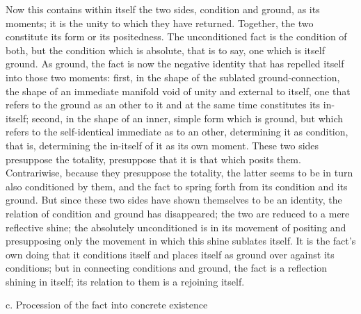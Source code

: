 Now this contains within itself the two sides,
condition and ground, as its moments;
it is the unity to which they have returned.
Together, the two constitute its form or its positedness.
The unconditioned fact is the condition of both,
but the condition which is absolute, that is to say,
one which is itself ground.
As ground, the fact is now the negative identity
that has repelled itself into those two moments:
first, in the shape of the sublated ground-connection,
the shape of an immediate manifold void of
unity and external to itself,
one that refers to the ground as an other to it
and at the same time constitutes its in-itself;
second, in the shape of an inner, simple form which is ground,
but which refers to the self-identical
immediate as to an other, determining it as condition,
that is, determining the in-itself of it as its own moment.
These two sides presuppose the totality,
presuppose that it is that which posits them.
Contrariwise, because they presuppose the totality,
the latter seems to be in turn also conditioned by them,
and the fact to spring forth from its condition and its ground.
But since these two sides have shown themselves to be an identity,
the relation of condition and ground has disappeared;
the two are reduced to a mere reflective shine;
the absolutely unconditioned is in its movement of positing
and presupposing only the movement in which this shine sublates itself.
It is the fact's own doing that it conditions itself
and places itself as ground over against its conditions;
but in connecting conditions and ground,
the fact is a reflection shining in itself;
its relation to them is a rejoining itself.

c. Procession of the fact into concrete existence

